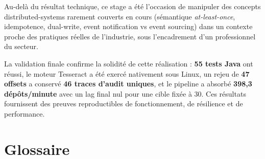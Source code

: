 \documentclass[12pt,a4paper,openany]{report}
\begin{document}
    Au-del\`a du r\'esultat technique, ce stage a \'et\'e l'occasion de manipuler des concepts distributed-systems rarement couverts en cours (s\'emantique \emph{at-least-once}, idempotence, dual-write, event notification vs event sourcing) dans un contexte proche des pratiques r\'eelles de l'industrie, sous l'encadrement d'un professionnel du secteur.

    La validation finale confirme la solidit\'e de cette r\'ealisation : \textbf{55 tests Java} ont r\'eussi, le moteur Tesseract a \'et\'e exerc\'e nativement sous Linux, un rejeu de \textbf{47 offsets} a conserv\'e \textbf{46 traces d'audit uniques}, et le pipeline a absorb\'e \textbf{398,3 d\'ep\^ots/minute} avec un lag final nul pour une cible fix\'ee \`a 30. Ces r\'esultats fournissent des preuves reproductibles de fonctionnement, de r\'esilience et de performance.

    \chapter{Glossaire}
\end{document}
